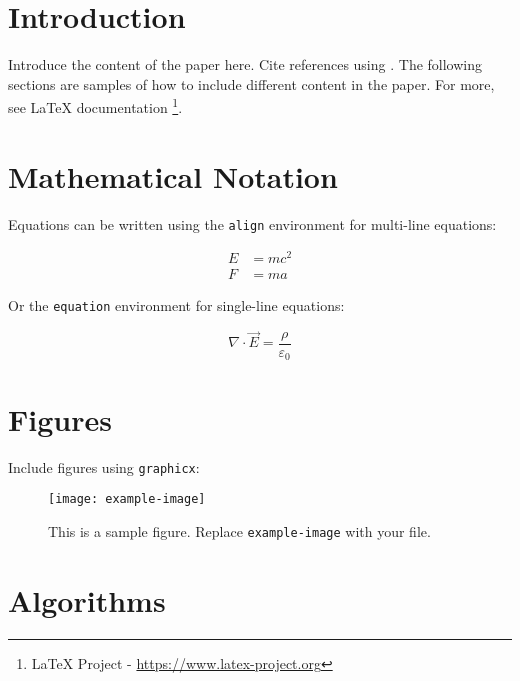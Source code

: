 \documentclass[twoside]{article}
\title{\customtitle{Your Paper Title}}
\author{
    Author One$^1$, Author Two$^2$, Author Three$^1$ \\
    {$^1$Affiliation One, $^2$Affiliation Two} \\
    \texttt{author.one@example.com, author.two@example.com, author.three@example.com}
}
\date{}
\begin{document}
\maketitle

\begin{abstract}
This is the abstract. It summarises the key contributions of the paper.
\end{abstract}


\section{Introduction}

Introduce the content of the paper here. Cite references using \cite{example}. The following sections are samples of how to include different content in the paper. For more, see LaTeX documentation \footnote{LaTeX Project - \url{https://www.latex-project.org}}.


\section{Mathematical Notation}

Equations can be written using the \texttt{align} environment for multi-line equations:

\begin{align}
    E &= mc^2 \\
    F &= ma
\end{align}

Or the \texttt{equation} environment for single-line equations:

\begin{equation}
    \nabla \cdot \vec{E} = \frac{\rho}{\varepsilon_0}
\end{equation}

\section{Figures}

Include figures using \texttt{graphicx}:

\begin{figure}[ht]
    \centering
    \texttt{[image: example-image]}
    \caption{This is a sample figure. Replace \texttt{example-image} with your file.}
    \label{fig:example}
\end{figure}

\section{Algorithms}
\end{document}
